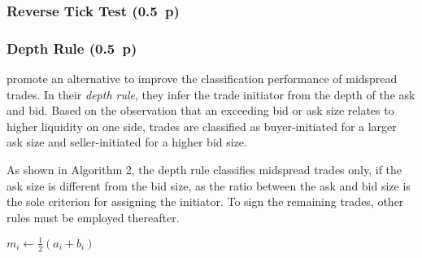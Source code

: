 \subsubsection{Reverse Tick Test (0.5~p)}\label{reverse-tick-test}

\subsubsection{Depth Rule (0.5~p)}\label{depth-rule}

\textcite{grauerOptionTradeClassification2022} promote an alternative to improve the classification performance of midspread trades. In their \textit{depth rule}, they infer the trade initiator from the depth of the ask and bid. Based on the observation that an exceeding bid or ask size relates to higher liquidity on one side, trades are classified as buyer-initiated for a larger ask size and seller-initiated for a higher bid size.

As shown in Algorithm 2, the depth rule classifies midspread trades only, if the ask size is different from the bid size, as the ratio between the ask and bid size is the sole criterion for assigning the initiator. To sign the remaining trades, other rules must be employed thereafter.

\begin{algorithm}


  \caption{$\operatorname{\mathtt{depth}}$ \label{alg:depth-rule}}


  \BlankLine %

  $m_i \leftarrow \frac{1}{2}(a_i + b_i)$ 

\end{algorithm}

